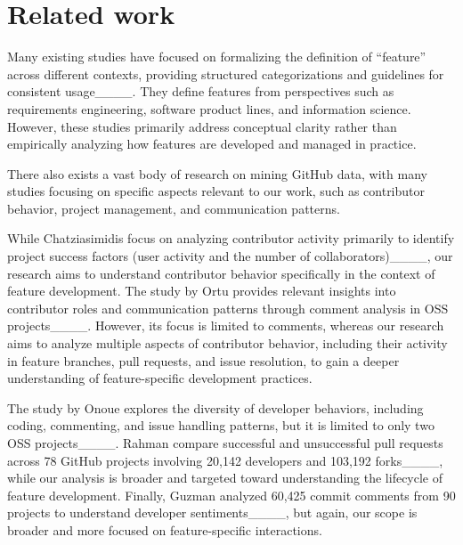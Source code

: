 \section{Related work}
\label{sec:related-work}
Many existing studies have focused on formalizing the definition of ``feature'' across different contexts, providing structured categorizations and guidelines for consistent usage____. 
They define features from perspectives such as requirements engineering, software product lines, and information science. 
However, these studies primarily address conceptual clarity rather than empirically analyzing how features are developed and managed in practice.

There also exists a vast body of research on mining GitHub data, with many studies focusing on specific aspects relevant to our work, such as contributor behavior, project management, and communication patterns. 

While Chatziasimidis \etal focus on analyzing contributor activity primarily to identify project success factors (\eg user activity and the number of collaborators)____, our research aims to understand contributor behavior specifically in the context of feature development. 
The study by Ortu \etal provides relevant insights into contributor roles and communication patterns through comment analysis in OSS projects____. 
However, its focus is limited to comments, whereas our research aims to analyze multiple aspects of contributor behavior, including their activity in feature branches, pull requests, and issue resolution, to gain a deeper understanding of feature-specific development practices.

The study by Onoue \etal explores the diversity of developer behaviors, including coding, commenting, and issue handling patterns, but it is limited to only two OSS projects____. 
Rahman \etal compare successful and unsuccessful pull requests across 78 GitHub projects involving 20,142 developers and 103,192 forks____, while our analysis is broader and targeted toward understanding the lifecycle of feature development. 
Finally, Guzman \etal analyzed 60,425 commit comments from 90 projects to understand developer sentiments____, but again, our scope is broader and more focused on feature-specific interactions.




